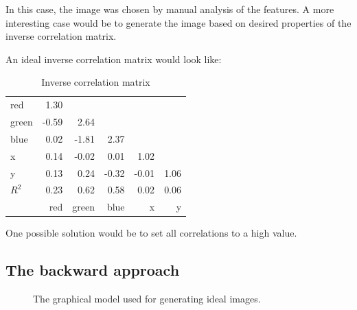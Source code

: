 \documentclass{article}
\begin{document}
In this case, the image was chosen by manual analysis of the
features. A more interesting case would be to generate the image based
on desired properties of the inverse correlation matrix. 

An ideal inverse correlation matrix would look like:

\begin{table}                                   
\centering                                      
\begin{tabular}{l|rrrrr}                    
    red   & 1.30  &       &       &       &      \\  
    green & -0.59 & 2.64  &       &       &      \\
    blue  & 0.02  & -1.81 & 2.37  &       &      \\ 
    x     & 0.14  & -0.02 & 0.01  & 1.02  &      \\ 
    y     & 0.13  & 0.24  & -0.32 & -0.01 & 1.06 \\ 
  \midrule
  $R^2$   & 0.23  & 0.62  & 0.58  & 0.02  & 0.06 \\
  \midrule
          & red   & green & blue  & x     & y
\end{tabular}                                   
\caption{Inverse correlation matrix}                        
\label{table:MyTableLabel}                      
\end{table} 


One possible solution would be to set all correlations to a high
value.

\subsection{The backward approach}

\begin{figure}[h]
  \centering
  \caption{The graphical model used for generating ideal images.}
\end{figure}
\end{document}
